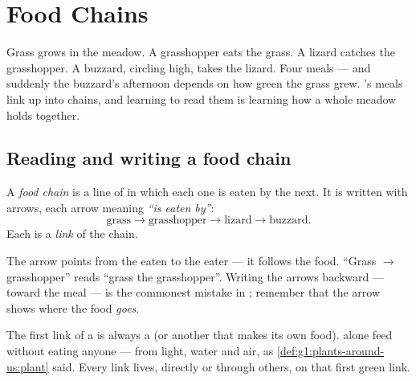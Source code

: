 \chapter{Food Chains}\label{ch:g3:food-chains}

Grass grows in the meadow. A grasshopper eats the grass. A
lizard catches the grasshopper. A buzzard, circling high, takes
the lizard. Four meals --- and suddenly the buzzard's afternoon
depends on how green the grass grew. 's meals link up
into chains, and learning to read them is learning how a whole
meadow holds together.

\section{Reading and writing a food chain}

\begin{definition}\label{def:g3:food-chains:chain}
A \emph{food chain} is a line of  in which each one is eaten by the next. It is written
with arrows, each arrow meaning \emph{``is eaten
by''}:
\[
\text{grass} \longrightarrow \text{grasshopper}
\longrightarrow \text{lizard} \longrightarrow \text{buzzard}.
\]
Each  is a \emph{link} of the chain.
\end{definition}

\begin{remark}\label{rem:g3:food-chains:arrow}
The arrow points from the eaten to the eater --- it follows the
food. ``Grass $\rightarrow$ grasshopper'' reads ``grass  the grasshopper''. Writing the arrows backward ---
toward the meal --- is the commonest mistake in ;
remember that the arrow shows where the food \emph{goes}.
\end{remark}

\begin{proposition}\label{prop:g3:food-chains:start}
The first link of a  is always a  (or another
 that makes its own food).  alone feed
without eating anyone --- from light, water and air, as
\cref{def:g1:plants-around-us:plant} said. Every  link
lives, directly or through others, on that first green link.
\end{proposition}
\admitted

